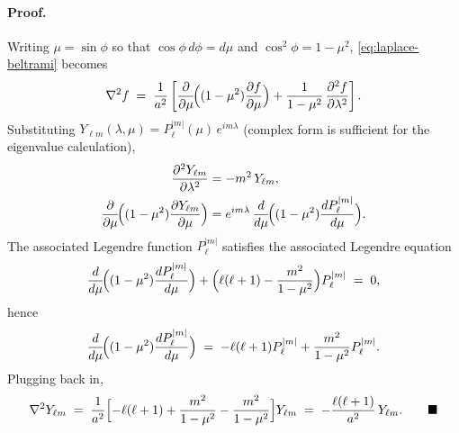 \documentclass[11pt]{article}
\begin{document}
\paragraph{Proof.}
Writing $\mu = \sin\phi$ so that $\cos\phi\,d\phi = d\mu$ and
$\cos^{2}\phi = 1-\mu^{2}$, \eqref{eq:laplace-beltrami} becomes
\begin{equation}
    \nabla^{2} f \;=\;
        \frac{1}{a^{2}}\left[\frac{\partial}{\partial\mu}\!
        \Bigl((1-\mu^{2})\frac{\partial f}{\partial\mu}\Bigr)
        + \frac{1}{1-\mu^{2}}\,\frac{\partial^{2} f}{\partial\lambda^{2}}\right].
\end{equation}
Substituting $Y_{\ell m}(\lambda,\mu) = P_{\ell}^{|m|}(\mu)\,e^{im\lambda}$
(complex form is sufficient for the eigenvalue calculation),
\begin{align*}
    \frac{\partial^{2} Y_{\ell m}}{\partial\lambda^{2}}
        &= -m^{2}\,Y_{\ell m},\\
    \frac{\partial}{\partial\mu}\!\Bigl((1-\mu^{2})
        \frac{\partial Y_{\ell m}}{\partial\mu}\Bigr)
        &= e^{im\lambda}\,\frac{d}{d\mu}\!\Bigl((1-\mu^{2})
          \frac{dP_{\ell}^{|m|}}{d\mu}\Bigr).
\end{align*}
The associated Legendre function $P_{\ell}^{|m|}$ satisfies the
associated Legendre equation
\begin{equation}
    \frac{d}{d\mu}\!\Bigl((1-\mu^{2})\frac{dP_{\ell}^{|m|}}{d\mu}\Bigr)
    +\Bigl(\ell(\ell+1) - \frac{m^{2}}{1-\mu^{2}}\Bigr)P_{\ell}^{|m|}
    \;=\; 0,
    \label{eq:assoc-legendre}
\end{equation}
hence
\begin{equation}
    \frac{d}{d\mu}\!\Bigl((1-\mu^{2})\frac{dP_{\ell}^{|m|}}{d\mu}\Bigr)
    \;=\; -\ell(\ell+1)P_{\ell}^{|m|}
          + \frac{m^{2}}{1-\mu^{2}}P_{\ell}^{|m|}.
\end{equation}
Plugging back in,
\begin{equation}
    \nabla^{2} Y_{\ell m} \;=\;
        \frac{1}{a^{2}}\Bigl[-\ell(\ell+1) + \frac{m^{2}}{1-\mu^{2}}
        - \frac{m^{2}}{1-\mu^{2}}\Bigr] Y_{\ell m}
        \;=\; -\frac{\ell(\ell+1)}{a^{2}}\,Y_{\ell m}.
    \tag*{$\blacksquare$}
\end{equation}
\end{document}

